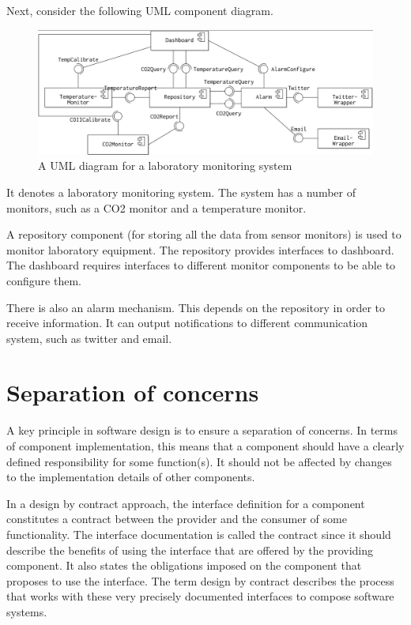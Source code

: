 \documentclass[a4paper, openany]{memoir}
\begin{document}
Next, consider the following UML component diagram.
\begin{figure}[H]
    \centering
    \includegraphics[scale=0.25]{src/14.2 UML Lab monitoring system.png}
    \caption{A UML diagram for a laboratory monitoring system}
\end{figure}
\noindent It denotes a laboratory monitoring system. The system has a number of monitors, such as a CO2 monitor and a temperature monitor. 

A repository component (for storing all the data from sensor monitors) is used to monitor laboratory equipment. The repository provides interfaces to dashboard. The dashboard requires interfaces to different monitor components to be able to configure them. 

There is also an alarm mechanism. This depends on the repository in order to receive information. It can output notifications to different communication system, such as twitter and email.

\section{Separation of concerns}
A key principle in software design is to ensure a separation of concerns. In terms of component implementation, this means that a component should have a clearly defined responsibility for some function(s). It should not be affected by changes to the implementation details of other components.

In a design by contract approach, the interface definition for a component constitutes a contract between the provider and the consumer of some functionality. The interface documentation is called the contract since it should describe the benefits of using the interface that are offered by the providing component. It also states the obligations imposed on the component that proposes to use the interface. The term design by contract describes the process that works with these very precisely documented interfaces to compose software systems.
\end{document}
